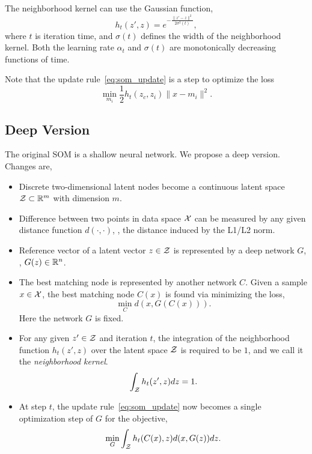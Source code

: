 The neighborhood kernel can use the Gaussian function,
\begin{equation}
    h_t(z',z) = e^{-\frac{\|z' - z\|^2}{2\sigma^2(t)}},
\end{equation}
where \(t\) is iteration time,
and \(\sigma(t)\) defines the width of the neighborhood kernel.
Both the learning rate \(\alpha_t\) and \(\sigma(t)\) are monotonically decreasing functions of time.

Note that the update rule~\eqref{eq:som_update} is a step to optimize the loss
\begin{equation}
    \min_{m_i} \frac{1}{2}h_t(z_c,z_i)\|x-m_i\|^2.
\end{equation}

\subsection{Deep Version}

The original SOM is a shallow neural network.
We propose a deep version.
Changes are,

\begin{itemize}
    \item Discrete two-dimensional latent nodes become a continuous latent space \(\mathcal{Z}\subset{\mathbb{R}}^m\) with dimension \(m\).
    \item Difference between two points in data space \(\mathcal{X}\) can be measured by any given distance function \(d(\cdot,\cdot)\),
        \eg, the distance induced by the L1/L2 norm.
    \item Reference vector of a latent vector \(z\in\mathcal{Z}\) is represented by a deep network \(G\), \ie, \(G(z)\in{\mathbb{R}}^n\).
    \item The best matching node is represented by another network \(C\).
        Given a sample \(x\in\mathcal{X}\),
        the best matching node \(C(x)\) is found via minimizing the loss,
        \begin{equation}\label{eq:soae_c}
            \min_C d(x, G(C(x))).
        \end{equation}
        Here the network \(G\) is fixed.
    \item For any given \(z'\in\mathcal{Z}\) and iteration \(t\),
        the integration of the neighborhood function \(h_t(z',z)\) over the latent space \(\mathcal{Z}\) is required to be \(1\),
        and we call it the \emph{neighborhood kernel}.
        \begin{equation}
            \int_{\mathcal{Z}} h_t(z',z)dz = 1.
        \end{equation}
    \item At step \(t\), the update rule~\eqref{eq:som_update} now becomes a single optimization step of \(G\) for the objective,
        \begin{equation}\label{eq:deep_update}
            \min_G \int_{\mathcal{Z}}h_t(C(x), z)d(x, G(z))dz.
        \end{equation}
\end{itemize}

